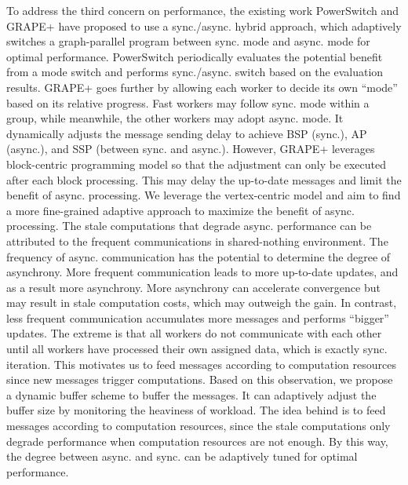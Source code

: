 To address the third concern on performance, the existing work PowerSwitch \cite{Xie2015SYNC} and GRAPE+ \cite{Fan2018Adaptive} have proposed to use a sync./async. hybrid approach, which adaptively switches a graph-parallel program between sync. mode and async. mode for optimal performance. PowerSwitch \cite{Xie2015SYNC} periodically evaluates the potential benefit from a mode switch and performs sync./async. switch based on the evaluation results. GRAPE+ \cite{Fan2018Adaptive} goes further by allowing each worker to decide its own ``mode'' based on its relative progress. Fast workers may follow sync. mode within a group, while meanwhile, the other workers may adopt async. mode. It dynamically adjusts the message sending delay to achieve BSP (sync.), AP (async.), and SSP (between sync. and async.). However, GRAPE+ leverages block-centric programming model so that the adjustment can only be executed after each block processing. This may delay the up-to-date messages and limit the benefit of async. processing. We leverage the vertex-centric model and aim to find a more fine-grained adaptive approach to maximize the benefit of async. processing. The stale computations that degrade async. performance can be attributed to the frequent communications in shared-nothing environment. The frequency of async. communication has the potential to determine the degree of asynchrony. More frequent communication leads to more up-to-date updates, and as a result more asynchrony. More asynchrony can accelerate convergence but may result in stale computation costs, which may outweigh the gain. In contrast, less frequent communication accumulates more messages and performs ``bigger'' updates. The extreme is that all workers do not communicate with each other until all workers have processed their own assigned data, which is exactly sync. iteration. This motivates us to feed messages according to computation resources since new messages trigger computations. Based on this observation, we propose a dynamic buffer scheme to buffer the messages. It can adaptively adjust the buffer size by monitoring the heaviness of workload. The idea behind is to feed messages according to computation resources, since the stale computations only degrade performance when computation resources are not enough. By this way, the degree between async. and sync. can be adaptively tuned for optimal performance.


